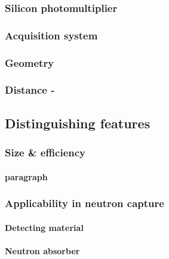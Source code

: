 \subsubsection{Silicon photomultiplier}

\subsubsection{Acquisition system}

\subsubsection{Geometry}

\subsubsection{Distance - }


\subsection{Distinguishing features}

\subsubsection{Size \& efficiency}

\paragraph{paragraph}

\subsubsection{Applicability in neutron capture}

\paragraph{Detecting material}

\paragraph{Neutron absorber}